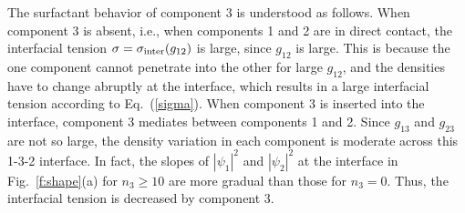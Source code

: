 \documentclass[pra,aps,superscriptaddress,twocolumn,color]{revtex4-1}
\begin{document}
The surfactant behavior of component 3 is understood as follows.
When component 3 is absent, i.e., when components 1 and 2 are in direct
contact, the interfacial tension $\sigma = \sigma_{\rm inter}({g_{12}})$ is
large, since $g_{12}$ is large.
This is because the one component cannot penetrate into the other for large
$g_{12}$, and the densities have to change abruptly at the interface, which
results in a large interfacial tension according to Eq.~(\ref{sigma}).
When component 3 is inserted into the interface, component 3 mediates
between components 1 and 2.
Since $g_{13}$ and $g_{23}$ are not so large, the density variation in each
component is moderate across this 1-3-2 interface.
In fact, the slopes of $|\psi_1|^2$ and $|\psi_2|^2$ at the interface in
Fig.~\ref{f:shape}(a) for $n_3 \geq 10$ are more gradual than those for $n_3
= 0$.
Thus, the interfacial tension is decreased by component 3.
\end{document}
